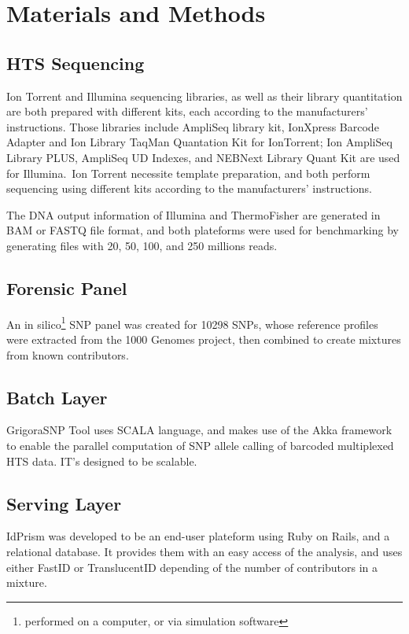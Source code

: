 \documentclass[../main.tex]{subfiles}
\begin{document}
\section{Materials and Methods}

\subsection{HTS Sequencing}
Ion Torrent and Illumina sequencing libraries, as well as their library quantitation are both prepared with different kits, each according to the manufacturers' instructions. Those libraries include AmpliSeq library kit, IonXpress Barcode Adapter and Ion Library TaqMan Quantation Kit for IonTorrent; Ion AmpliSeq Library PLUS, AmpliSeq UD Indexes, and  NEBNext Library Quant Kit are used for Illumina.\
Ion Torrent necessite template preparation, and both perform sequencing using different kits according to the manufacturers' instructions.

The DNA output information of Illumina and ThermoFisher are generated in BAM or FASTQ file format, and both plateforms were used for benchmarking by generating files with 20, 50, 100, and 250 millions reads.

\subsection{Forensic Panel}

An in silico\footnote{performed on a computer, or via simulation software} SNP panel was created for 10298 SNPs, whose reference profiles were extracted from the 1000 Genomes project\cite{genomes}, then combined to create mixtures from known contributors.

\subsection{Batch Layer}

GrigoraSNP Tool uses SCALA language, and makes use of the Akka framework to enable the parallel computation of SNP allele calling of barcoded multiplexed HTS data. IT's designed to be  scalable.

\subsection{Serving Layer}

IdPrism was developed to be an end-user plateform using Ruby on Rails, and a relational database. It provides them with an easy access of the analysis, and uses either FastID or TranslucentID depending of the number of contributors in a mixture.
\end{document}
